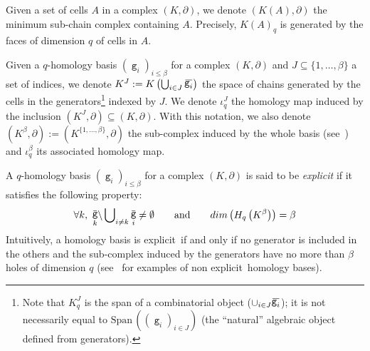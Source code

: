 \documentclass[runningheads]{llncs}
\DeclareMathOperator{\g}{\mathtt{g}}
\newcommand\Span{\mathrm{Span}\,}
\newcommand{\dr}{\partial}
\newcommand{\cplx}{{(K,\partial)} }
\newcommand{\ols}[1]{\mskip.5\thinmuskip\overline{\mskip-.5\thinmuskip {#1} \mskip-.5\thinmuskip}\mskip.5\thinmuskip} %
\newcommand{\explicit}{explicit}
\newcommand{\Explicit}{Explicit}
\newcommand{\bs}{\backslash}
\newcommand{\tx}[1]{\text{#1}}
\newcommand{\add}[1]{{#1}}%
\newcommand{\commentYS}[1]{{\textit{\color{blue}\textbf{YS}: #1}}}
\begin{document}
    \begin{definition}\label{def:induced-complex}
        Given a set of cells $A$ in a complex $\cplx$, we denote $(K(A),\dr)$ the minimum sub-chain complex containing $A$.
        Precisely, $K(A)_q$ is generated by the faces of dimension $q$ of cells in $A$.
    \end{definition}

    Given a $q$-homology basis $(\g_i)_{i\leq\beta}$ for a complex $\cplx$ and $J \subseteq \{1, \dots, \beta\}$ a set of indices, we denote $K^J := K\left(\bigcup_{i \in J} \ols{\g_i}\right)$ the space of chains generated by the cells in the generators\footnote{\add{Note that $K^J_q$ is the span of a combinatorial object ($\cup_{i\in J} \ols{\g_i}$); it is not necessarily equal to $\Span\left((\g_i)_{i\in J}\right)$ (the ``natural'' algebraic object defined from generators).}} indexed by $J$.
    We denote $\iota_q^J$ the homology map induced by the inclusion $(K^J,\dr) \subseteq (K,\dr)$.
    With this notation, we also denote $(K^\beta,\dr) := (K^{\{1, \dots, \beta\}},\dr)$ the sub-complex induced by the whole basis (see~) and $\iota_q^\beta$ its associated homology map.
    
    \begin{definition}[\Explicit\ homology bases]\label{def:explicit-bases}
        A $q$-homology basis $(\g_i)_{i\leq\beta}$ for a complex $\cplx$ is said to be \emph{\explicit} if it satisfies the following property:
        $$
            \forall k,\ \ols{\g_k}\bs\bigcup\nolimits_{i \neq k} \ols{\g_i} \neq \emptyset \qquad \tx{and}\qquad
            dim \left( H_q\left(K^{\beta}\right) \right) = \beta
        $$
        Intuitively, a homology basis is \explicit\ if and only if no generator is included in the others and the sub-complex induced by the generators have no more than $\beta$ holes of dimension $q$ (see~ for examples of non \explicit\ homology bases).
    \end{definition}
    
\end{document}
